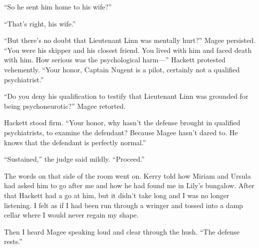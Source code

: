 \documentclass{novel}
\begin{document}
{“So he sent him home to his wife?”

“That’s right, his wife.”

“But there’s no doubt that Lieutenant Linn was mentally hurt?” Magee persisted. “You were his skipper and his closest friend. You lived with him and faced death with him. How serious was the psychological harm—” Hackett protested vehemently. “Your honor, Captain Nugent is a pilot, certainly not a qualified psychiatrist.”

“Do you deny his qualification to testify that Lieutenant Linn was grounded for being psychoneurotic?” Magee retorted.

Hackett stood firm. “Your honor, why hasn’t the defense brought in qualified psychiatrists, to examine the defendant? Because Magee hasn’t dared to. He knows that the defendant is perfectly normal.”

“Sustained,” the judge said mildly. “Proceed.”

The words on that side of the room went on. Kerry told how Miriam and Ursula had asked him to go after me and how he had found me in Lily’s bungalow. After that Hackett had a go at him, but it didn’t take long and I was no longer listening. I felt as if I had been run through a wringer and tossed into a damp cellar where I would never regain my shape.

Then I heard Magee speaking loud and clear through the hush. “The defense rests.”

}

\vspace{2\nbs}
\clearpage
\thispagestyle{empty}
\end{document}
